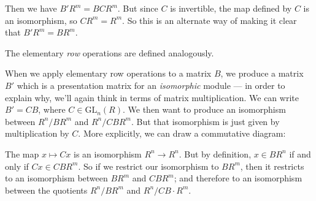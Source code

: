 Then we have $B'R^m = BCR^m$. But since $C$ is invertible, the map defined by $C$ is an isomorphism, so $CR^m = R^m$. So this is an alternate way of making it clear that $B'R^m = BR^m$. 


The elementary \emph{row} operations are defined analogously. 

When we apply elementary row operations to a matrix $B$, we produce a matrix $B'$ which is a presentation matrix for an \emph{isomorphic} module --- in order to explain why, we'll again think in terms of matrix multiplication. We can write $B' = CB$, where $C \in \mathrm{GL}_n(R)$. We then want to produce an isomorphism between $R^n/BR^m$ and $R^n/CBR^m$. But that isomorphism is just given by multiplication by $C$. More explicitly, we can draw a commutative diagram:



\begin{center}
\end{center}

The map $x \mapsto Cx$ is an isomorphism $R^n \to R^n$. But by definition, $x \in BR^n$ if and only if $Cx \in CBR^m$. So if we restrict our isomorphism to $BR^m$, then it restricts to an isomorphism between $BR^m$ and $CBR^m$; and therefore to an isomorphism between the quotients $R^n/BR^m$ and $R^n/CB\cdot R^m$. %

